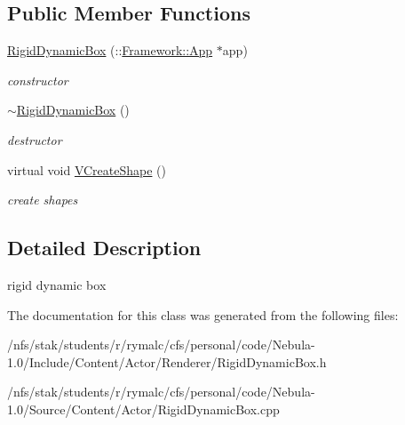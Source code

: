 \subsection*{Public Member Functions}
\begin{DoxyCompactItemize}
\item 
\hypertarget{classContent_1_1Actor_1_1RigidDynamicBox_a2e4cd173ef866b8562b441b63dd191c8}{
\hyperlink{classContent_1_1Actor_1_1RigidDynamicBox_a2e4cd173ef866b8562b441b63dd191c8}{RigidDynamicBox} (::\hyperlink{classFramework_1_1App}{Framework::App} $\ast$app)}
\label{classContent_1_1Actor_1_1RigidDynamicBox_a2e4cd173ef866b8562b441b63dd191c8}

\begin{DoxyCompactList}\small\item\em constructor \item\end{DoxyCompactList}\item 
\hypertarget{classContent_1_1Actor_1_1RigidDynamicBox_aaea12bbf5e751e9ad66fda2c5168467c}{
\hyperlink{classContent_1_1Actor_1_1RigidDynamicBox_aaea12bbf5e751e9ad66fda2c5168467c}{$\sim$RigidDynamicBox} ()}
\label{classContent_1_1Actor_1_1RigidDynamicBox_aaea12bbf5e751e9ad66fda2c5168467c}

\begin{DoxyCompactList}\small\item\em destructor \item\end{DoxyCompactList}\item 
\hypertarget{classContent_1_1Actor_1_1RigidDynamicBox_a8f5b56e028b5d35b9f43e7667a76eeef}{
virtual void \hyperlink{classContent_1_1Actor_1_1RigidDynamicBox_a8f5b56e028b5d35b9f43e7667a76eeef}{VCreateShape} ()}
\label{classContent_1_1Actor_1_1RigidDynamicBox_a8f5b56e028b5d35b9f43e7667a76eeef}

\begin{DoxyCompactList}\small\item\em create shapes \item\end{DoxyCompactList}\end{DoxyCompactItemize}


\subsection{Detailed Description}
rigid dynamic box 

The documentation for this class was generated from the following files:\begin{DoxyCompactItemize}
\item 
/nfs/stak/students/r/rymalc/cfs/personal/code/Nebula-\/1.0/Include/Content/Actor/Renderer/RigidDynamicBox.h\item 
/nfs/stak/students/r/rymalc/cfs/personal/code/Nebula-\/1.0/Source/Content/Actor/RigidDynamicBox.cpp\end{DoxyCompactItemize}
